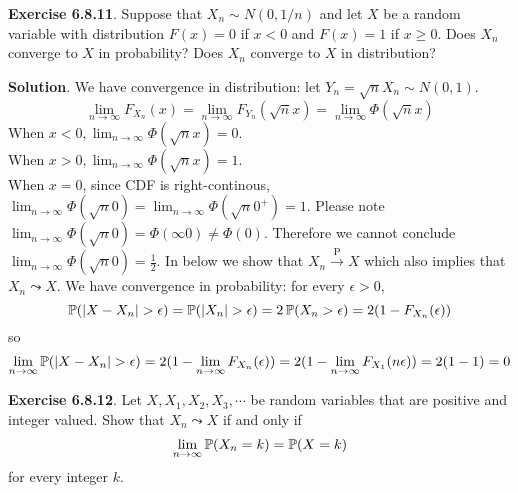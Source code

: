 \textbf{Exercise 6.8.11}. Suppose that \(X_{n} \sim N(0, 1/n)\) and let
\(X\) be a random variable with distribution \(F(x) = 0\) if \(x < 0\)
and \(F(x) = 1\) if \(x \geq 0\). Does \(X_{n}\) converge to \(X\) in
probability? Does \(X_{n}\) converge to \(X\) in distribution?

\textbf{Solution}.
We have convergence in distribution: let
\(Y_{n} = \sqrt{n}X_{n} \sim N(0,1)\).
\[
\lim_{n \rightarrow \infty} F_{X_{n}}(x) = \lim_{n \rightarrow \infty} F_{Y_{n}} (\sqrt{n}x) = \lim_{n \rightarrow \infty} \Phi(\sqrt{n}x)
\]
When \(x < 0, \lim_{n \rightarrow \infty} \Phi(\sqrt{n}x) = 0\).\\
When \(x > 0, \lim_{n \rightarrow \infty} \Phi(\sqrt{n}x) = 1\).\\
When \(x = 0\), since CDF is right-continous,
\(\lim_{n \rightarrow \infty} \Phi(\sqrt{n}0)=\lim_{n \rightarrow \infty} \Phi(\sqrt{n}0^+) = 1\).
Please note
\(\lim_{n \rightarrow \infty} \Phi(\sqrt{n}0) =  \Phi(\infty 0) \neq \Phi(0)\).
Therefore we cannot conclude
\(\lim_{n \rightarrow \infty} \Phi(\sqrt{n}0) = \frac{1}{2}\).
In below we show that \(X_{n} \xrightarrow{\textrm{P}} X\) which also implies that \(X_{n} \leadsto X\).
We have convergence in probability: for every \(\epsilon > 0\),
\[
\operatorname{\mathbb{P}}(|X - X_{n}| > \epsilon) = \operatorname{\mathbb{P}}(|X_{n}| > \epsilon) = 2 \operatorname{\mathbb{P}}(X_{n} > \epsilon) = 2 (1 - F_{X_{n}}(\epsilon))
\]
so
\[
\lim _{n \rightarrow \infty} \operatorname{\mathbb{P}}(|X - X_{n}| > \epsilon)  = 2 (1 - \lim _{n \rightarrow \infty} F_{X_{n}}(\epsilon)) =  2 (1 - \lim _{n \rightarrow \infty} F_{X_{1}}(n \epsilon)) = 2 (1 - 1) = 0
\]

\textbf{Exercise 6.8.12}. Let \(X, X_{1}, X_{2}, X_{3}, \cdots\) be random variables that are positive and integer valued. Show that \(X_{n} \leadsto X\) if and only if
\[
\lim _{n \rightarrow \infty} \operatorname{\mathbb{P}}(X_{n} = k) = \operatorname{\mathbb{P}}(X = k)
\]
for every integer \(k\).

